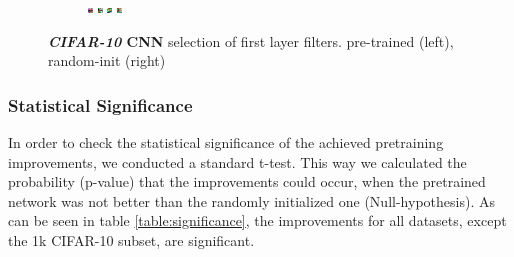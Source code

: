 \documentclass[draft]{article}
\begin{document}
\begin{figure}
\begin{subfigure}{.4\linewidth}
              \includegraphics[width=0.1\linewidth]{../graphics/cifar_filters/random_15.png}
              \includegraphics[width=0.1\linewidth]{../graphics/cifar_filters/random_16.png} %
              \includegraphics[width=0.1\linewidth]{../graphics/cifar_filters/random_17.png} %
              \includegraphics[width=0.1\linewidth]{../graphics/cifar_filters/random_18.png}
            \end{subfigure}

          \caption{\textbf{\emph{CIFAR-10} CNN} selection of first layer filters. pre-trained (left), random-init (right)}
          \label{fig:cifar_filters}

      \end{figure}



  \subsubsection{Statistical Significance}
    In order to check the statistical significance of the achieved pretraining improvements, we conducted a standard t-test.
    This way we calculated the probability (p-value) that the improvements could occur, when the pretrained network was not better than the randomly initialized one (Null-hypothesis).
    As can be seen in table \ref{table:significance}, the improvements for all datasets, except the 1k CIFAR-10 subset, are significant.
\end{document}

